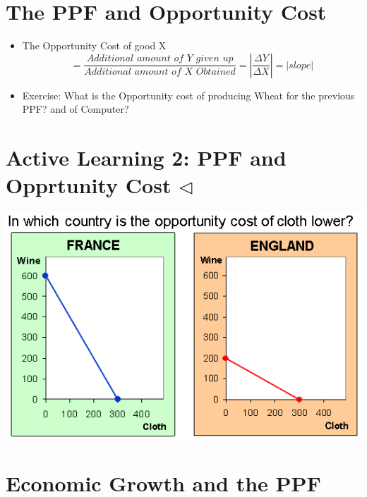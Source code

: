 \documentclass[
]{book}
\begin{document}
\hypertarget{the-ppf-and-opportunity-cost}{%
\section{The PPF and Opportunity Cost}\label{the-ppf-and-opportunity-cost}}

\begin{itemize}
\item
  The Opportunity Cost of good X
  \[= \frac{\textit{Additional amount of Y given up}}{\textit{Additional amount of X Obtained}} = |\frac{\Delta Y}{\Delta X} | = |slope|\]
\item
  Exercise: What is the Opportunity cost of producing Wheat for the previous PPF? and of Computer?
\end{itemize}

\hypertarget{active-learning-2-ppf-and-opprtunity-cost-triangleleft}{%
\section{\texorpdfstring{Active Learning 2: PPF and Opprtunity Cost \(\triangleleft\)}{Active Learning 2: PPF and Opprtunity Cost \textbackslash triangleleft}}\label{active-learning-2-ppf-and-opprtunity-cost-triangleleft}}

\includegraphics[width=\textwidth,height=0.5\textheight]{images/lesson02/page14.PNG}

\hypertarget{economic-growth-and-the-ppf}{%
\section{Economic Growth and the PPF}\label{economic-growth-and-the-ppf}}
\end{document}
